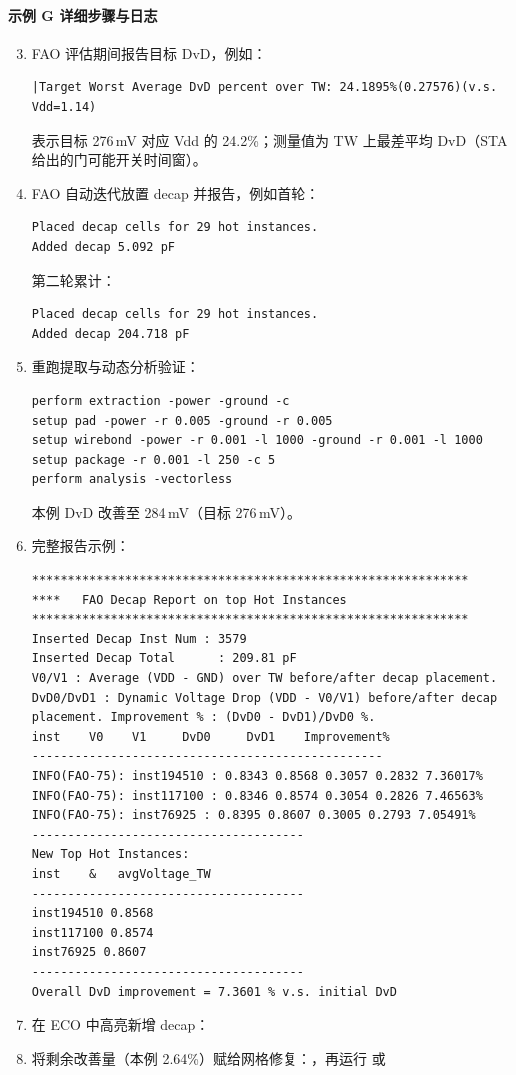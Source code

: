 \paragraph{示例 G 详细步骤与日志}
\begin{enumerate}
  \setcounter{enumi}{2}
  \item FAO 评估期间报告目标 DvD，例如：
\begin{lstlisting}
|Target Worst Average DvD percent over TW: 24.1895%(0.27576)(v.s. Vdd=1.14)
\end{lstlisting}
  表示目标 276\,mV 对应 Vdd 的 24.2\%；测量值为 TW 上最差平均 DvD（STA 给出的门可能开关时间窗）。
  \item FAO 自动迭代放置 decap 并报告，例如首轮：
\begin{lstlisting}
Placed decap cells for 29 hot instances.
Added decap 5.092 pF
\end{lstlisting}
  第二轮累计：
\begin{lstlisting}
Placed decap cells for 29 hot instances.
Added decap 204.718 pF
\end{lstlisting}
  \item 重跑提取与动态分析验证：
\begin{lstlisting}
perform extraction -power -ground -c
setup pad -power -r 0.005 -ground -r 0.005
setup wirebond -power -r 0.001 -l 1000 -ground -r 0.001 -l 1000
setup package -r 0.001 -l 250 -c 5
perform analysis -vectorless
\end{lstlisting}
  本例 DvD 改善至 284\,mV（目标 276\,mV）。
  \item {} 完整报告示例：
\begin{lstlisting}
*************************************************************
****   FAO Decap Report on top Hot Instances
*************************************************************
Inserted Decap Inst Num : 3579
Inserted Decap Total      : 209.81 pF
V0/V1 : Average (VDD - GND) over TW before/after decap placement.
DvD0/DvD1 : Dynamic Voltage Drop (VDD - V0/V1) before/after decap
placement. Improvement % : (DvD0 - DvD1)/DvD0 %.
inst    V0    V1     DvD0     DvD1    Improvement%
-------------------------------------------------
INFO(FAO-75): inst194510 : 0.8343 0.8568 0.3057 0.2832 7.36017%
INFO(FAO-75): inst117100 : 0.8346 0.8574 0.3054 0.2826 7.46563%
INFO(FAO-75): inst76925 : 0.8395 0.8607 0.3005 0.2793 7.05491%
--------------------------------------
New Top Hot Instances:
inst    &   avgVoltage_TW
--------------------------------------
inst194510 0.8568
inst117100 0.8574
inst76925 0.8607
--------------------------------------
Overall DvD improvement = 7.3601 % v.s. initial DvD
\end{lstlisting}
  \item 在 ECO 中高亮新增 decap：
  \item 将剩余改善量（本例 2.64\%）赋给网格修复：，再运行  或 
\end{enumerate}

